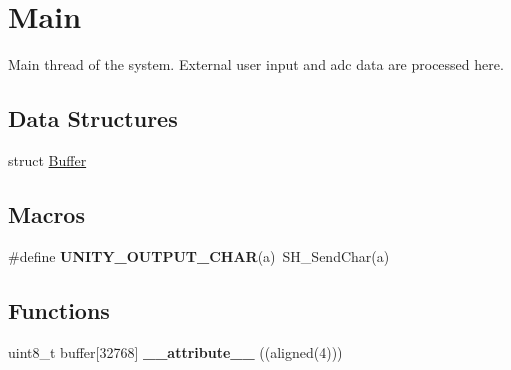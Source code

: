\hypertarget{group__main}{}\section{Main}
\label{group__main}


Main thread of the system. External user input and adc data are processed here.  


\subsection*{Data Structures}
\begin{DoxyCompactItemize}
\item 
struct \hyperlink{struct_buffer}{Buffer}
\end{DoxyCompactItemize}
\subsection*{Macros}
\begin{DoxyCompactItemize}
\item 
\hypertarget{group__main_ga7f32cab7edafc4634a8faa14b3e0042c}{}\#define {\bfseries U\+N\+I\+T\+Y\+\_\+\+O\+U\+T\+P\+U\+T\+\_\+\+C\+H\+A\+R}(a)~S\+H\+\_\+\+Send\+Char(a)\label{group__main_ga7f32cab7edafc4634a8faa14b3e0042c}

\end{DoxyCompactItemize}
\subsection*{Functions}
\begin{DoxyCompactItemize}
\item 
\hypertarget{group__main_ga818acd0ef479ded56084cebbfb8b1136}{}uint8\+\_\+t buffer\mbox{[}32768\mbox{]} {\bfseries \+\_\+\+\_\+attribute\+\_\+\+\_\+} ((aligned(4)))\label{group__main_ga818acd0ef479ded56084cebbfb8b1136}

\end{DoxyCompactItemize}
